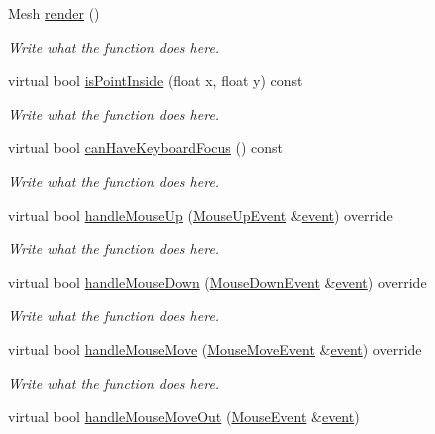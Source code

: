 \begin{DoxyCompactItemize}
\item 
Mesh \hyperlink{classGUIElement_aeb5af965b0ea78a4699d1263690a14fa}{render} ()
\begin{DoxyCompactList}\small\item\em Write what the function does here. \end{DoxyCompactList}\item 
virtual bool \hyperlink{classGUIElement_a5f0fe42b4b9fc20f01397e7face80ae6}{is\+Point\+Inside} (float x, float y) const 
\begin{DoxyCompactList}\small\item\em Write what the function does here. \end{DoxyCompactList}\item 
virtual bool \hyperlink{classGUIElement_a073ef8863e95e55df4b701f249ba4c44}{can\+Have\+Keyboard\+Focus} () const 
\begin{DoxyCompactList}\small\item\em Write what the function does here. \end{DoxyCompactList}\item 
virtual bool \hyperlink{classGUIElement_afcccb09fab792ee06ab929dec8a9d8e7}{handle\+Mouse\+Up} (\hyperlink{structMouseUpEvent}{Mouse\+Up\+Event} \&\hyperlink{unionSDL__Event}{event}) override
\begin{DoxyCompactList}\small\item\em Write what the function does here. \end{DoxyCompactList}\item 
virtual bool \hyperlink{classGUIElement_a4809909ae2b25f816407da43b4a8f771}{handle\+Mouse\+Down} (\hyperlink{structMouseDownEvent}{Mouse\+Down\+Event} \&\hyperlink{unionSDL__Event}{event}) override
\begin{DoxyCompactList}\small\item\em Write what the function does here. \end{DoxyCompactList}\item 
virtual bool \hyperlink{classGUIElement_a82b0ee7067d1c1deaef595f312592c5a}{handle\+Mouse\+Move} (\hyperlink{structMouseMoveEvent}{Mouse\+Move\+Event} \&\hyperlink{unionSDL__Event}{event}) override
\begin{DoxyCompactList}\small\item\em Write what the function does here. \end{DoxyCompactList}\item 
virtual bool \hyperlink{classGUIElement_a0e4fe2486bff60c1dfcd058244be7acf}{handle\+Mouse\+Move\+Out} (\hyperlink{classMouseEvent}{Mouse\+Event} \&\hyperlink{unionSDL__Event}{event})

\end{DoxyCompactItemize}
